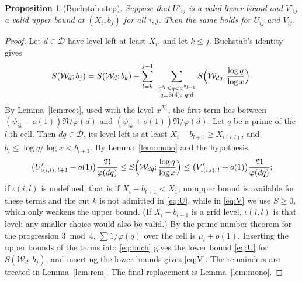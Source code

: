 \documentclass[11pt,a4paper]{amsart}
\newtheorem{proposition}[theorem]{Proposition}
\theoremstyle{remark}
\numberwithin{equation}{section}
\newcommand{\cW}{\mathcal W}
\newcommand{\cN}{\mathfrak N}
\begin{document}
\begin{proposition}[Buchstab step]\label{prop:step}
Suppose that $U'_{ij}$ is a valid lower bound and $V'_{ij}$ a valid upper bound at $(X_i,b_j)$ for all $i,j$. Then
the same holds for $U_{ij}$ and $V_{ij}$.
\end{proposition}
\begin{proof}
Let $d\in\mathcal D$ have level left at least $X_i$, and let $k\le j$. Buchstab's identity gives
\begin{equation}\label{eq:buch}
S(\cW_d;b_j)=S(\cW_d;b_k)-\sum_{l=k}^{j-1}\ \sum_{\substack{x^{b_l}\le q<x^{b_{l+1}}\\ q\equiv3(4),\ q\nmid d}}S\Bigl(\cW_{dq};\frac{\log q}{\log x}\Bigr).
\end{equation}
By Lemma~\ref{lem:rect}, used with the level $x^{X_i}$, the first term lies between
$(\psi^-_{ik}-o(1))\cN/\varphi(d)$ and $(\psi^+_{ik}+o(1))\cN/\varphi(d)$. Let $q$ be a prime of the $l$-th cell.
Then $dq\in\mathcal D$, its level left is at least $X_i-b_{l+1}\ge X_{\iota(i,l)}$, and
$b_l\le\log q/\log x<b_{l+1}$. By Lemma~\ref{lem:mono} and the hypothesis,
\[
\bigl(U'_{\iota(i,l),\,l+1}-o(1)\bigr)\frac{\cN}{\varphi(dq)}\le S\Bigl(\cW_{dq};\frac{\log q}{\log x}\Bigr)\le
\bigl(V'_{\iota(i,l),\,l}+o(1)\bigr)\frac{\cN}{\varphi(dq)} ;
\]
if $\iota(i,l)$ is undefined, that is if $X_i-b_{l+1}<X_1$, no upper bound is available for these terms and
the cut $k$ is not admitted in \eqref{eq:U}, while in \eqref{eq:V} we use $S\ge0$, which only weakens the upper
bound. (If $X_i-b_{l+1}$ is a grid level, $\iota(i,l)$ is that level; any smaller choice would also be valid.) By the prime number theorem for the progression $3\bmod 4$,
$\sum1/\varphi(q)$ over the cell is $\mu_l+o(1)$. Inserting the upper bounds of the terms into \eqref{eq:buch}
gives the lower bound \eqref{eq:U} for $S(\cW_d;b_j)$, and inserting the lower bounds gives \eqref{eq:V}. The remainders are treated in Lemma~\ref{lem:rem}. The final replacement is
Lemma~\ref{lem:mono}.
\end{proof}
\end{document}
